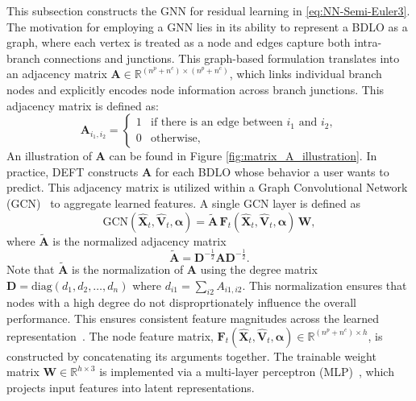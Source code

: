 This subsection constructs the GNN for residual learning in \eqref{eq:NN-Semi-Euler3}. 
The motivation for employing a GNN lies in its ability to represent a BDLO as a graph, where each vertex is treated as a node and edges capture both intra-branch connections and junctions. 
This graph-based formulation translates into an adjacency matrix \(\mathbf{A} \in \mathbb{R}^{(n^p + n^c) \times (n^p + n^c)}\), which links individual branch nodes and explicitly encodes node information across branch junctions.
This adjacency matrix is defined as:
\begin{equation}
\mathbf{A}_{i_1, i_2} =
\begin{cases}
1 & \text{if there is an edge between } i_1 \text{ and } i_2, \\
0 & \text{otherwise,}
\end{cases}
\end{equation}
An illustration of $\mathbf{A}$ can be found in Figure \ref{fig:matrix_A_illustration}. 
In practice,  DEFT constructs $\mathbf{A}$ for each BDLO whose behavior a user wants to predict.
This adjacency matrix is utilized within a Graph Convolutional Network (GCN)~\cite{GCN} to aggregate learned features. 
A single GCN layer is defined as
\begin{equation}
  \text{GCN}(\hat{\mathbf{X}}_t, \hat{\mathbf{V}}_t, \bm{\alpha}) 
  = \mathbf{\tilde{A}} \,\mathbf{F}_t(\hat{\mathbf{X}}_t, \hat{\mathbf{V}}_t, \bm{\alpha}) \,\mathbf{W},
  \label{eq:GCN}
\end{equation}
where \(\mathbf{\tilde{A}}\) is the normalized adjacency matrix 
\begin{equation}
\mathbf{\tilde{A}} = \mathbf{D}^{-\frac{1}{2}} \mathbf{A} \mathbf{D}^{-\frac{1}{2}}.
\label{eq:normalizedA}
\end{equation}
Note that $\mathbf{\tilde{A}}$ is the normalization of \(\mathbf{A}\) using the degree matrix \(\mathbf{D} = \mathrm{diag}(d_1, d_2, \ldots, d_n)\)  where \(d_{i1} = \sum_{i2} A_{i1,i2}\).
This normalization ensures that nodes with a high degree do not disproprtionately influence the overall performance. 
This ensures consistent feature magnitudes across the learned representation~\cite{GNNreview}.
The node feature matrix, \(\mathbf{F}_t(\hat{\mathbf{X}}_t, \hat{\mathbf{V}}_t, \bm{\alpha}) \in \mathbb{R}^{(n^p + n^c) \times h}\), is constructed by concatenating its arguments together. 
The trainable weight matrix \(\mathbf{W} \in \mathbb{R}^{h \times 3}\) is implemented via a multi-layer perceptron (MLP)~\cite{MLP}, which projects input features into latent representations.

